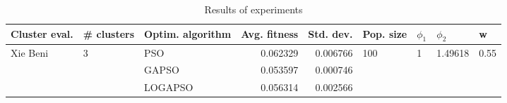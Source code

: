 \begin{table}
\centering
\caption{Results of experiments}
\begin{tabular}{lllrrllll}
\toprule
            Cluster eval. &        \# clusters & Optim. algorithm &  Avg. fitness &  Std. dev. &            Pop. size &         $\phi_{1}$ &               $\phi_{2}$ &                     w \\
\midrule
\multirow{3}{*}{Xie Beni} & \multirow{3}{*}{3} &              PSO &      0.062329 &   0.006766 & \multirow{3}{*}{100} & \multirow{3}{*}{1} & \multirow{3}{*}{1.49618} & \multirow{3}{*}{0.55} \\
                          &                    &            GAPSO &      0.053597 &   0.000746 &                      &                    &                          &                       \\
                          &                    &          LOGAPSO &      0.056314 &   0.002566 &                      &                    &                          &                       \\
\bottomrule
\end{tabular}
\end{table}
